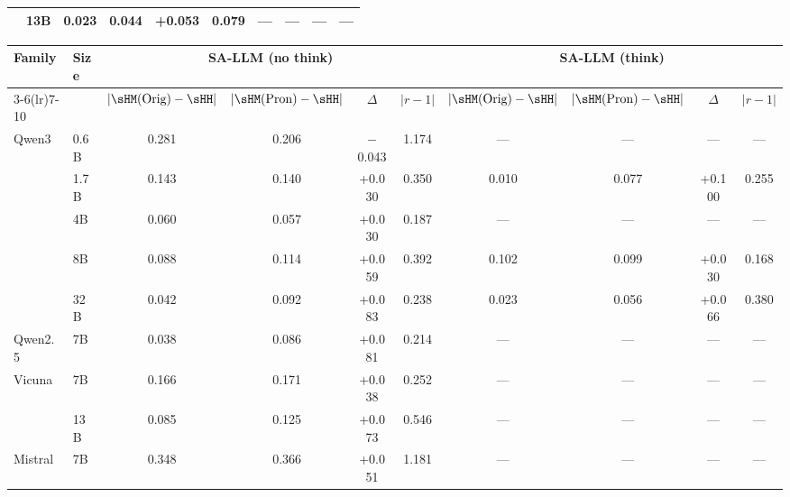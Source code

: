 \begin{table}[t]
\begin{tabular}{llcccc|cccc}
 & 13B & 0.023 & 0.044 & +0.053 & 0.079 & {\scriptsize ---} & {\scriptsize ---} & {\scriptsize ---} & {\scriptsize ---} \\
\bottomrule
\end{tabular}
\vspace{4pt}
\begin{tabular}{llcccc|cccc}
\toprule
\multirow{2}{*}{\textbf{Family}} & \multirow{2}{*}{\textbf{Size}} & \multicolumn{4}{c|}{\textbf{SA-LLM (no think)}} & \multicolumn{4}{c}{\textbf{SA-LLM (think)}} \\
\cmidrule(lr){3-6}\cmidrule(lr){7-10}
 & & $|\sHM(\text{Orig}) - \sHH|$ & $|\sHM(\text{Pron}) - \sHH|$ & $\Delta$ & $|r - 1|$ & $|\sHM(\text{Orig}) - \sHH|$ & $|\sHM(\text{Pron}) - \sHH|$ & $\Delta$ & $|r - 1|$ \\
\midrule
Qwen3 & 0.6B & 0.281 & 0.206 & $-$0.043 & 1.174 & {\scriptsize ---} & {\scriptsize ---} & {\scriptsize ---} & {\scriptsize ---} \\
 & 1.7B & 0.143 & 0.140 & +0.030 & 0.350 & 0.010 & 0.077 & +0.100 & 0.255 \\
 & 4B & 0.060 & 0.057 & +0.030 & 0.187 & {\scriptsize ---} & {\scriptsize ---} & {\scriptsize ---} & {\scriptsize ---} \\
 & 8B & 0.088 & 0.114 & +0.059 & 0.392 & 0.102 & 0.099 & +0.030 & 0.168 \\
 & 32B & 0.042 & 0.092 & +0.083 & 0.238 & 0.023 & 0.056 & +0.066 & 0.380 \\
Qwen2.5 & 7B & 0.038 & 0.086 & +0.081 & 0.214 & {\scriptsize ---} & {\scriptsize ---} & {\scriptsize ---} & {\scriptsize ---} \\
Vicuna & 7B & 0.166 & 0.171 & +0.038 & 0.252 & {\scriptsize ---} & {\scriptsize ---} & {\scriptsize ---} & {\scriptsize ---} \\
 & 13B & 0.085 & 0.125 & +0.073 & 0.546 & {\scriptsize ---} & {\scriptsize ---} & {\scriptsize ---} & {\scriptsize ---} \\
Mistral & 7B & 0.348 & 0.366 & +0.051 & 1.181 & {\scriptsize ---} & {\scriptsize ---} & {\scriptsize ---} & {\scriptsize ---} \\
\bottomrule
\end{tabular}
\end{table}
